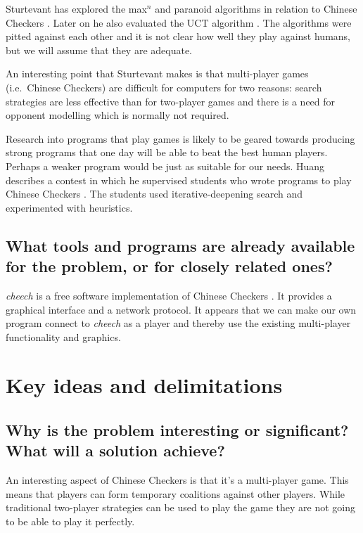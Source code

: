 \documentclass[a4paper,11pt]{report}
\begin{document}
Sturtevant has explored the max$^n$ and paranoid algorithms in
relation to Chinese Checkers
\cite{springerlink:10.1007/978-3-540-40031-8_8}. Later on he also
evaluated the UCT algorithm
\cite{springerlink:10.1007/978-3-540-87608-3_4}. The algorithms were
pitted against each other and it is not clear how well they play
against humans, but we will assume that they are adequate.

An interesting point that Sturtevant makes is that multi-player games
(i.e.~Chinese Checkers) are difficult for computers for two reasons:
search strategies are less effective than for two-player games and
there is a need for opponent modelling which is normally not required.

Research into programs that play games is likely to be geared towards
producing strong programs that one day will be able to beat the best
human players. Perhaps a weaker program would be just as suitable for
our needs. Huang describes a contest in which he supervised students
who wrote programs to play Chinese Checkers
\cite{Huang:2001:SGP:378593.378708}. The students used
iterative-deepening search and experimented with heuristics.

\section{What tools and programs are already available for the problem, or for closely related ones?}

\emph{cheech} is a free software implementation of Chinese Checkers
\cite{cheech}. It provides a graphical interface and a network
protocol. It appears that we can make our own program connect to
\emph{cheech} as a player and thereby use the existing multi-player
functionality and graphics.

\chapter{Key ideas and delimitations} 
\section{Why is the problem interesting or significant?  What will a solution achieve?}

An interesting aspect of Chinese Checkers is that it's a multi-player
game. This means that players can form temporary coalitions against
other players. While traditional two-player strategies can be used to
play the game they are not going to be able to play it perfectly.
\end{document}
